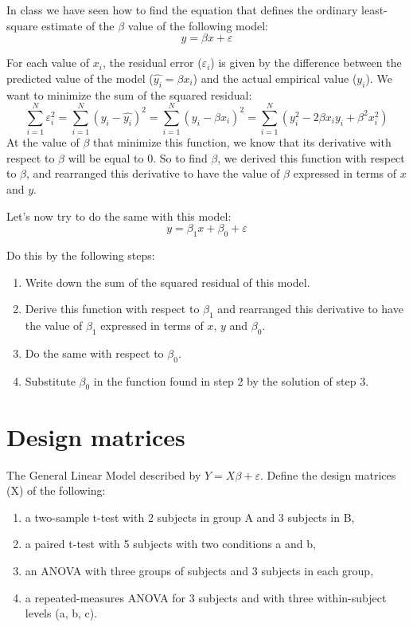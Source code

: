 \documentclass[a4paper,10pt]{article}
\begin{document}
In class we have seen how to find the equation that defines the ordinary 
least-square estimate of the $\beta$ value of the following model:
\begin{displaymath}
  y = \beta x + \varepsilon
\end{displaymath}

For each value of $x_{i}$, the residual error ($\varepsilon_{i}$) is given by the difference between the predicted value of the model ($\hat{y_{i}} = \beta x_{i}$) and the actual empirical value ($y_{i}$). We want to minimize the sum of the squared residual:
\begin{displaymath}
  \sum_{i=1}^{N} \varepsilon_{i}^{2} = \sum_{i=1}^{N}(y_{i} - \hat{y_{i}})^{2} = \sum_{i=1}^{N} (y_{i} - \beta x_{i})^{2} = \sum_{i=1}^{N} (y_{i}^{2} - 2\beta x_{i}y_{i} + \beta^{2} x_{i}^{2})
\end{displaymath}
At the value of $\beta$ that minimize this function, we know that its 
derivative with respect to $\beta$ will be equal to 0. So to find $\beta$, 
we derived this function with respect to $\beta$, and rearranged this 
derivative to have the value of $\beta$ expressed in terms of $x$ and $y$.

\medskip
Let's now try to do the same with this model:
\begin{displaymath}
  y = \beta_{1} x + \beta_{0} + \varepsilon
\end{displaymath}

Do this by the following steps:
\begin{enumerate}
 \item Write down the sum of the squared residual of this model.
 \item Derive this function with respect to $\beta_{1}$ and rearranged this 
derivative to have the value of $\beta_{1}$ expressed in terms of $x$, $y$ and  
$\beta_{0}$.
 \item Do the same with respect to $\beta_{0}$.
 \item Substitute $\beta_{0}$ in the function found in step 2 by the solution 
of step 3.
\end{enumerate}


\section{Design matrices}

The General Linear Model described by $Y=X\beta+\varepsilon$. Define the design matrices (X) of the following:
\begin{enumerate}
  \item a two-sample t-test with 2 subjects in group A and 3 subjects in B,
  \item a paired t-test with 5 subjects with two conditions a and b,
  \item an ANOVA with three groups of subjects and 3 subjects in each group,
  \item a repeated-measures ANOVA for 3 subjects and with three within-subject levels (a, b, c).
\end{enumerate}
\end{document}
